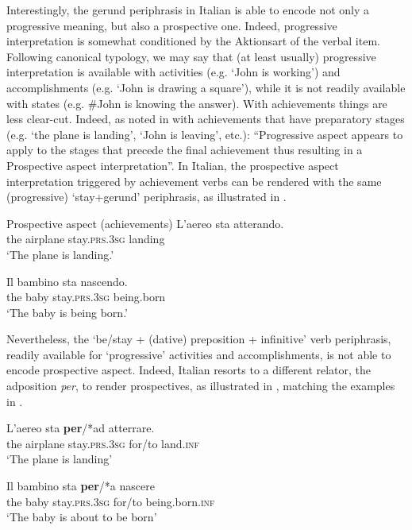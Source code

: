 \documentclass[output=paper,modfonts,nonflat,newtxmath,colorlinks,citecolor=brown]{langsci/langscibook}
\begin{document}
Interestingly, the gerund periphrasis in Italian is able to encode not only a progressive meaning, but also a prospective one. Indeed, progressive interpretation is somewhat conditioned by the Aktionsart of the verbal item. Following  canonical typology, we may say that (at least usually) progressive interpretation is available with {activities} (e.g. ‘John is working’) and {accomplishments} (e.g. ‘John is drawing a square’), while it is not readily available with {states} (e.g. \#John is knowing the answer). With {achievements} things are less clear-cut. Indeed, as noted in \citet[538]{Cinque2017} with achievements that have preparatory stages (e.g. ‘the plane is landing’, ‘John is leaving’, etc.): “Progressive aspect appears to apply to the stages that precede the final achievement thus resulting in a Prospective aspect interpretation”. In Italian, the prospective aspect interpretation triggered by achievement verbs can be rendered with the same (progressive) ‘stay+gerund’ periphrasis, as illustrated in . 

\ea Prospective aspect (achievements)%
	\label{ex:franco:22}
    \ea \label{ex:franco:22a}
    \gll L’aereo sta atterando.\\
        the airplane stay.\textsc{prs.3sg} landing\\
    \glt ‘The plane is landing.’
    
     \ex \label{ex:franco:22b}
    \gll Il bambino sta nascendo.  \\
        the baby stay.\textsc{prs.3sg} being.born\\
    \glt ‘The baby is being born.’
    \z
    \z
    
Nevertheless, the ‘be/stay + (dative) preposition + infinitive’ verb periphrasis, readily available for ‘progressive’ activities and accomplishments, is not able to encode prospective aspect. Indeed, Italian resorts to a different relator, the adposition \textit{per}, to render prospectives, as illustrated in , matching the examples in .

\ea%
	\label{ex:franco:23}
    \ea \label{ex:franco:23a}
    \gll L’aereo sta \textbf{per}/*ad atterrare.\\
       the airplane stay.\textsc{prs.3sg} for/to land.\textsc{inf}\\
    \glt  ‘The plane is landing’
    
     \ex \label{ex:franco:23b}
    \gll  Il bambino sta \textbf{per}/*a nascere\\
        the baby stay.\textsc{prs.3sg} for/to being.born.\textsc{inf}\\
    \glt ‘The baby is about to be born’
    \z
    \z
\end{document}
